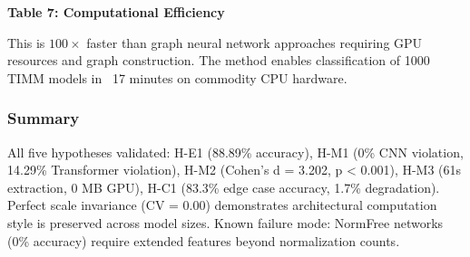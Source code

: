 \textbf{Table 7: Computational Efficiency}

\begin{table}[htbp]
\centering
{}
\end{table}

This is $100\times$ faster than graph neural network approaches requiring GPU resources and graph construction. The method enables classification of 1000 TIMM models in ~17 minutes on commodity CPU hardware.

\subsubsection{Summary}

All five hypotheses validated: H-E1 (88.89\% accuracy), H-M1 (0\% CNN violation, 14.29\% Transformer violation), H-M2 (Cohen's d = 3.202, p < 0.001), H-M3 (61s extraction, 0 MB GPU), H-C1 (83.3\% edge case accuracy, 1.7\% degradation). Perfect scale invariance (CV = 0.00) demonstrates architectural computation style is preserved across model sizes. Known failure mode: NormFree networks (0\% accuracy) require extended features beyond normalization counts.
